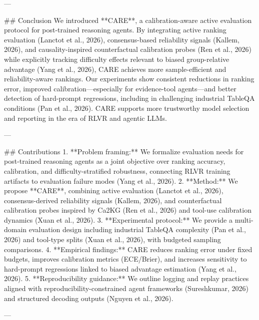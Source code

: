 ---

## Conclusion
We introduced **CARE**, a calibration-aware active evaluation protocol for post-trained reasoning agents. By integrating active ranking evaluation (Lanctot et al., 2026), consensus-based reliability signals (Kallem, 2026), and causality-inspired counterfactual calibration probes (Ren et al., 2026) while explicitly tracking difficulty effects relevant to biased group-relative advantage (Yang et al., 2026), CARE achieves more sample-efficient and reliability-aware rankings. Our experiments show consistent reductions in ranking error, improved calibration—especially for evidence-tool agents—and better detection of hard-prompt regressions, including in challenging industrial TableQA conditions (Pan et al., 2026). CARE supports more trustworthy model selection and reporting in the era of RLVR and agentic LLMs.

---

## Contributions
1. **Problem framing:** We formalize evaluation needs for post-trained reasoning agents as a joint objective over ranking accuracy, calibration, and difficulty-stratified robustness, connecting RLVR training artifacts to evaluation failure modes (Yang et al., 2026).
2. **Method:** We propose **CARE**, combining active evaluation (Lanctot et al., 2026), consensus-derived reliability signals (Kallem, 2026), and counterfactual calibration probes inspired by Ca2KG (Ren et al., 2026) and tool-use calibration dynamics (Xuan et al., 2026).
3. **Experimental protocol:** We provide a multi-domain evaluation design including industrial TableQA complexity (Pan et al., 2026) and tool-type splits (Xuan et al., 2026), with budgeted sampling comparisons.
4. **Empirical findings:** CARE reduces ranking error under fixed budgets, improves calibration metrics (ECE/Brier), and increases sensitivity to hard-prompt regressions linked to biased advantage estimation (Yang et al., 2026).
5. **Reproducibility guidance:** We outline logging and replay practices aligned with reproducibility-constrained agent frameworks (Sureshkumar, 2026) and structured decoding outputs (Nguyen et al., 2026).

---